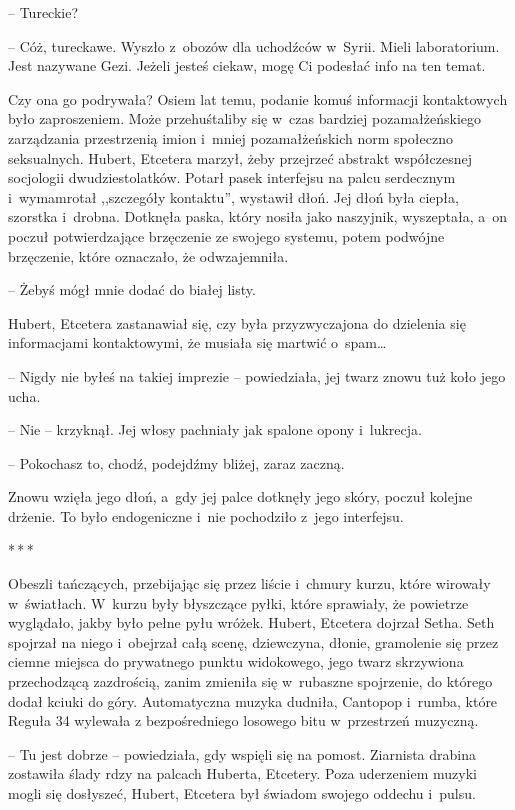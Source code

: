 \documentclass[oneside,polish,11pt,sfheadings]{mwbk}
\newcommand{\threeast}{\bigskip\par\centerline{*\,*\,*}\medskip\par}
\begin{document}
-- Tureckie?

-- Cóż, tureckawe. Wyszło z~obozów dla uchodźców w~Syrii. Mieli
laboratorium. Jest nazywane Gezi. Jeżeli jesteś ciekaw, mogę Ci podesłać
info na ten temat.

Czy ona go podrywała? Osiem lat temu, podanie komuś informacji
kontaktowych było zaproszeniem. Może przehuśtaliby się w~czas bardziej
pozamałżeńskiego zarządzania przestrzenią imion i~mniej pozamałżeńskich
norm społeczno \dywiz seksualnych. Hubert, Etcetera marzył, żeby przejrzeć
abstrakt współczesnej socjologii dwudziestolatków. Potarł pasek
interfejsu na palcu serdecznym i~wymamrotał ,,szczegóły kontaktu'',
wystawił dłoń. Jej dłoń była ciepła, szorstka i~drobna. Dotknęła paska,
który nosiła jako naszyjnik, wyszeptała, a~on poczuł potwierdzające
brzęczenie ze swojego systemu, potem podwójne brzęczenie, które
oznaczało, że odwzajemniła.

-- Żebyś mógł mnie dodać do białej listy.

Hubert, Etcetera zastanawiał się, czy była przyzwyczajona do dzielenia
się informacjami kontaktowymi, że musiała się martwić o~spam\ldots 

-- Nigdy nie byłeś na takiej imprezie -- powiedziała, jej twarz znowu tuż
koło jego ucha.

-- Nie -- krzyknął. Jej włosy pachniały jak spalone opony i~lukrecja.

-- Pokochasz to, chodź, podejdźmy bliżej, zaraz zaczną.

Znowu wzięła jego dłoń, a~gdy jej palce dotknęły jego skóry, poczuł
kolejne drżenie. To było endogeniczne i~nie pochodziło z~jego
interfejsu.

\threeast

Obeszli tańczących, przebijając się przez liście i~chmury kurzu, które
wirowały w~światłach. W~kurzu były błyszczące pyłki, które sprawiały, że
powietrze wyglądało, jakby było pełne pyłu wróżek. Hubert, Etcetera
dojrzał Setha. Seth spojrzał na niego i~obejrzał całą scenę, dziewczyna,
dłonie, gramolenie się przez ciemne miejsca do prywatnego punktu
widokowego, jego twarz skrzywiona przechodzącą zazdrością, zanim
zmieniła się w~rubaszne spojrzenie, do którego dodał kciuki do góry.
Automatyczna muzyka dudniła, Cantopop i~rumba, które Reguła 34 wylewała
z bezpośredniego losowego bitu w~przestrzeń muzyczną.

-- Tu jest dobrze -- powiedziała, gdy wspięli się na pomost. Ziarnista
drabina zostawiła ślady rdzy na palcach Huberta, Etcetery. Poza
uderzeniem muzyki mogli się dosłyszeć, Hubert, Etcetera był świadom
swojego oddechu i~pulsu.
\end{document}
